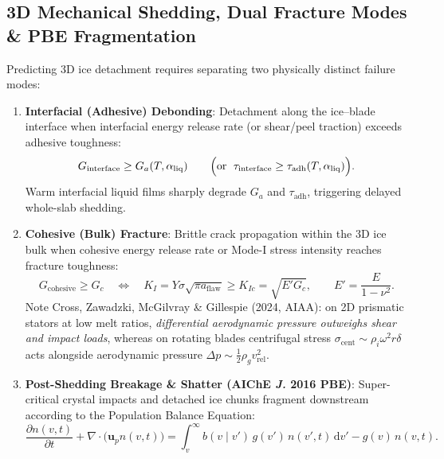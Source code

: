 \documentclass[11pt,a4paper]{article}
\newcommand{\dd}{\mathrm{d}}
\newcommand{\pd}[2]{\frac{\partial #1}{\partial #2}}
\begin{document}
\subsection{3D Mechanical Shedding, Dual Fracture Modes \& PBE Fragmentation}
Predicting 3D ice detachment requires separating two physically distinct failure modes:
\begin{enumerate}[leftmargin=1.5em,itemsep=3pt]
  \item \textbf{Interfacial (Adhesive) Debonding}: Detachment along the ice--blade interface when interfacial energy release rate (or shear/peel traction) exceeds adhesive toughness:
  \begin{equation}
    G_{\text{interface}} \ge G_a(T, \alpha_{\text{liq}}) \qquad \Bigl(\text{or }\; \tau_{\text{interface}} \ge \tau_{\text{adh}}(T, \alpha_{\text{liq}})\Bigr).
  \end{equation}
  Warm interfacial liquid films sharply degrade $G_a$ and $\tau_{\text{adh}}$, triggering delayed whole-slab shedding.
  \item \textbf{Cohesive (Bulk) Fracture}: Brittle crack propagation within the 3D ice bulk when cohesive energy release rate or Mode-I stress intensity reaches fracture toughness:
  \begin{equation}
    G_{\text{cohesive}} \ge G_c \quad\Longleftrightarrow\quad K_I = Y \sigma \sqrt{\pi a_{\text{flaw}}} \ge K_{Ic} = \sqrt{E' G_c},
    \qquad E' = \frac{E}{1 - \nu^2}.
  \end{equation}
  Note Cross, Zawadzki, McGilvray \& Gillespie (2024, AIAA): on 2D prismatic stators at low melt ratios, \emph{differential aerodynamic pressure outweighs shear and impact loads}, whereas on rotating blades centrifugal stress $\sigma_{\text{cent}} \sim \rho_i \omega^2 r \delta$ acts alongside aerodynamic pressure $\Delta p \sim \tfrac{1}{2}\rho_g v_{\text{rel}}^2$.
  \item \textbf{Post-Shedding Breakage \& Shatter (AIChE \emph{J.} 2016 PBE)}: Super-critical crystal impacts and detached ice chunks fragment downstream according to the Population Balance Equation:
  \begin{equation}
    \pd{n(v,t)}{t} + \nabla\cdot\bigl(\mathbf{u}_p n(v,t)\bigr) = \int_v^\infty b(v\mid v')\,g(v')\,n(v',t)\,\dd v' - g(v)\,n(v,t).
  \end{equation}
\end{enumerate}
\end{document}
